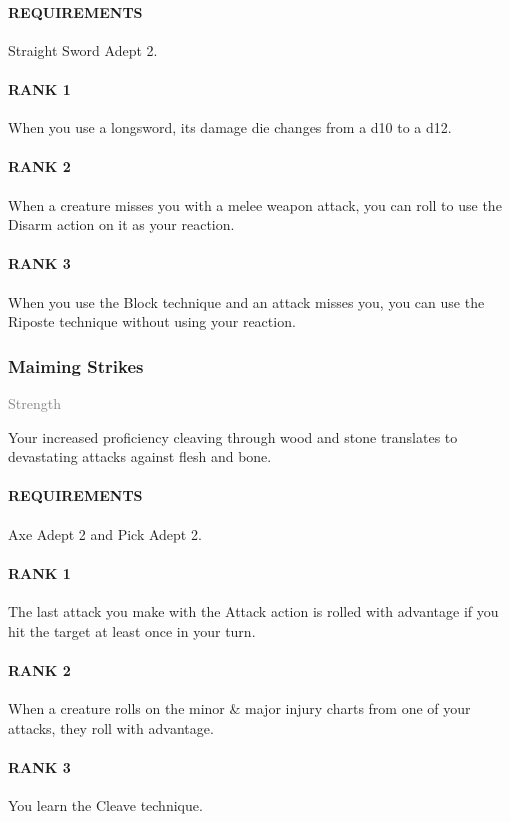 \paragraph{REQUIREMENTS} Straight Sword Adept 2.
\paragraph{RANK 1} When you use a longsword, its damage die changes from a d10 to a d12.
\paragraph{RANK 2} When a creature misses you with a melee weapon attack, you can roll to use the Disarm action on it as your reaction.
\paragraph{RANK 3} When you use the Block technique and an attack misses you, you can use the Riposte technique without using your reaction.

\subsubsection{Maiming Strikes} \label{feat::maimingstrikes}
\small{\textcolor{gray}{Strength}}

\normalsize
Your increased proficiency cleaving through wood and stone translates to devastating attacks against flesh and bone.
\paragraph{REQUIREMENTS} Axe Adept 2 and Pick Adept 2.
\paragraph{RANK 1} The last attack you make with the Attack action is rolled with advantage if you hit the target at least once in your turn.
\paragraph{RANK 2} When a creature rolls on the minor \& major injury charts from one of your attacks, they roll with advantage.
\paragraph{RANK 3} You learn the Cleave technique.

